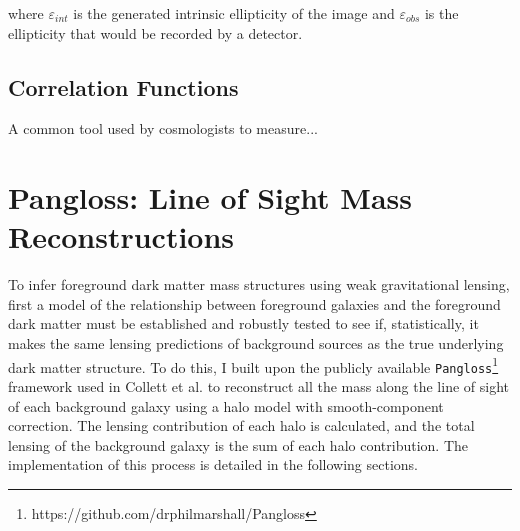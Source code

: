 \documentclass[%
 reprint,
 amsmath,amssymb,
 aps,nofootinbib
]{revtex4-1}
\begin{document}
\noindent where $\varepsilon_{int}$ is the generated intrinsic ellipticity of the image and $\varepsilon_{obs}$ is the ellipticity that would be recorded by a detector.


\subsection{Correlation Functions}

A common tool used by cosmologists to measure...   

\section{Pangloss: Line of Sight Mass Reconstructions}


To infer foreground dark matter mass structures using weak gravitational lensing, first a model of the relationship between foreground galaxies and the foreground dark matter must be established and robustly tested to see if, statistically, it makes the same lensing predictions of background sources as the true underlying dark matter structure. To do this, I built upon the publicly available \texttt{Pangloss}\footnote{\label{note1}https://github.com/drphilmarshall/Pangloss} framework used in Collett et al. \cite{collett_marshall} to reconstruct all the
mass along the line of sight of each background galaxy using a halo model with smooth-component correction. The lensing contribution of each halo is calculated, and the total lensing of the background galaxy is the sum of each halo contribution. The implementation of this process is detailed in the following sections.
\end{document}
